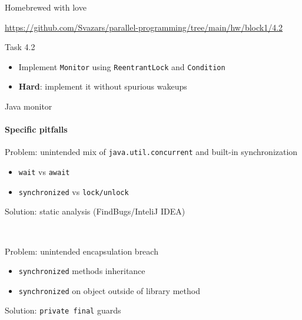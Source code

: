 \begin{frame}[t]{Homebrewed with love}

{\small\url{https://github.com/Svazars/parallel-programming/tree/main/hw/block1/4.2}}
\begin{homeworkmail}{Task 4.2}
    \begin{itemize}
        \item Implement \texttt{Monitor} using \texttt{ReentrantLock} and \texttt{Condition}
        \item \textbf{Hard}: implement it without spurious wakeups
    \end{itemize}
\end{homeworkmail}
\end{frame}


\begin{frame}[t,fragile]{Java monitor}
\framesubtitle{Specific pitfalls}

Problem: unintended mix of \texttt{java.util.concurrent} and built-in synchronization
\begin{itemize}
    \item \texttt{wait} vs \texttt{await}
    \item \texttt{synchronized} vs \texttt{lock/unlock}
\end{itemize}
Solution: static analysis (FindBugs/InteliJ IDEA)

\pause
\ 
\newline

Problem: unintended encapsulation breach
\begin{itemize}
    \item \texttt{synchronized} methods inheritance
    \item \texttt{synchronized} on object outside of library method
\end{itemize}

Solution: \texttt{private final} guards

\end{frame}

